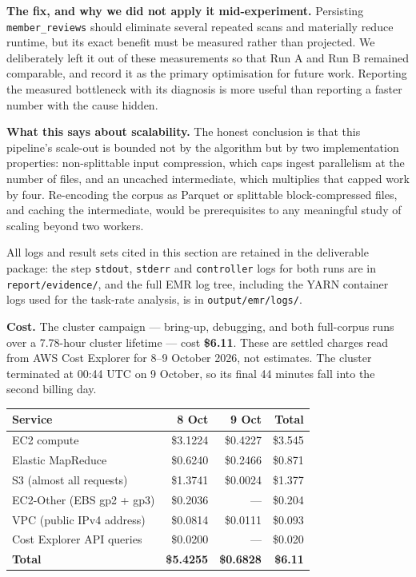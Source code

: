 \documentclass[12pt]{article}
\begin{document}
\textbf{The fix, and why we did not apply it mid-experiment.} Persisting
\texttt{member\_reviews} should eliminate several repeated scans and materially
reduce runtime, but its exact benefit must be measured rather than projected.
We deliberately left it out of these measurements so that Run A and Run B
remained comparable, and record it as the primary optimisation for future
work. Reporting the measured bottleneck with its diagnosis is more useful than
reporting a faster number with the cause hidden.

\textbf{What this says about scalability.} The honest conclusion is that this
pipeline's scale-out is bounded not by the algorithm but by two implementation
properties: non-splittable input compression, which caps ingest parallelism at
the number of files, and an uncached intermediate, which multiplies that
capped work by four. Re-encoding the corpus as Parquet or splittable
block-compressed files, and caching the intermediate, would be prerequisites
to any meaningful study of scaling beyond two workers.

All logs and result sets cited in this section are retained in the
deliverable package: the step \texttt{stdout}, \texttt{stderr} and
\texttt{controller} logs for both runs are in
\texttt{report/evidence/}, and the full EMR log tree, including the YARN
container logs used for the task-rate analysis, is in
\texttt{output/emr/logs/}.

\textbf{Cost.} The cluster campaign --- bring-up, debugging, and both
full-corpus runs over a 7.78-hour cluster lifetime --- cost \textbf{\$6.11}.
These are settled charges read from AWS Cost Explorer for 8--9 October 2026,
not estimates. The cluster terminated at 00:44 UTC on 9 October, so its final
44 minutes fall into the second billing day.

\begin{center}
\begin{tabular}{@{}lrrr@{}}
  \toprule
  \textbf{Service} & \textbf{8 Oct} & \textbf{9 Oct} & \textbf{Total} \\
  \midrule
  EC2 compute                      & \$3.1224 & \$0.4227 & \$3.545 \\
  Elastic MapReduce                & \$0.6240 & \$0.2466 & \$0.871 \\
  S3 (almost all requests)         & \$1.3741 & \$0.0024 & \$1.377 \\
  EC2-Other (EBS gp2 + gp3)        & \$0.2036 & ---      & \$0.204 \\
  VPC (public IPv4 address)        & \$0.0814 & \$0.0111 & \$0.093 \\
  Cost Explorer API queries        & \$0.0200 & ---      & \$0.020 \\
  \midrule
  \textbf{Total}                   & \textbf{\$5.4255} & \textbf{\$0.6828}
                                   & \textbf{\$6.11} \\
  \bottomrule
\end{tabular}
\end{center}
\end{document}
